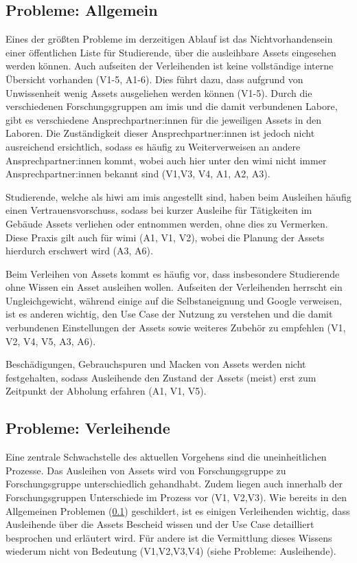 \subsection{Probleme: Allgemein}
\label{section:probleme-allgemein}
Eines der größten Probleme im derzeitigen Ablauf ist das Nichtvorhandensein
einer öffentlichen Liste für Studierende, über die ausleihbare Assets eingesehen
werden können. Auch aufseiten der Verleihenden ist keine vollständige interne
Übersicht vorhanden (V1-5, A1-6). Dies führt dazu, dass aufgrund von Unwissenheit
wenig Assets ausgeliehen werden können (V1-5). Durch die verschiedenen
Forschungsgruppen am \ac{imis} und die damit verbundenen Labore, gibt es
verschiedene Ansprechpartner:innen für die jeweiligen Assets in den Laboren. Die
Zuständigkeit dieser Ansprechpartner:innen ist jedoch nicht ausreichend
ersichtlich, sodass es häufig zu Weiterverweisen an andere Ansprechpartner:innen
kommt, wobei auch hier unter den \ac{wimi} nicht immer Ansprechpartner:innen
bekannt sind (V1,V3, V4, A1, A2, A3).

Studierende, welche als \ac{hiwi} am \ac{imis} angestellt sind, haben beim
Ausleihen häufig einen Vertrauensvorschuss, sodass bei kurzer Ausleihe für
Tätigkeiten im Gebäude Assets verliehen oder entnommen werden, ohne dies zu
Vermerken. Diese Praxis gilt auch für \ac{wimi} (A1, V1, V2), wobei die
Planung der Assets hierdurch erschwert wird (A3, A6).

Beim Verleihen von Assets kommt es häufig vor, dass insbesondere Studierende
ohne Wissen  ein Asset ausleihen wollen. Aufseiten der Verleihenden herrscht
ein Ungleichgewicht, während einige auf die Selbstaneignung und Google
verweisen, ist es anderen wichtig, den Use Case der Nutzung zu verstehen und die
damit verbundenen Einstellungen der Assets sowie weiteres Zubehör zu empfehlen
(V1, V2, V4, V5, A3, A6).

Beschädigungen, Gebrauchspuren und Macken von Assets werden nicht festgehalten,
sodass Ausleihende den Zustand der Assets (meist) erst zum Zeitpunkt der
Abholung erfahren (A1, V1, V5).

\subsection{Probleme: Verleihende}
\label{section:probleme-verleihende}
Eine zentrale Schwachstelle des aktuellen Vorgehens sind die uneinheitlichen
Prozesse. Das Ausleihen von Assets wird von Forschungsgruppe zu Forschungsgruppe
unterschiedlich gehandhabt. Zudem liegen auch innerhalb der Forschungsgruppen
Unterschiede im Prozess vor (V1, V2,V3). Wie bereits in den Allgemeinen
Problemen (\ref{section:probleme-allgemein}) geschildert, ist es einigen
Verleihenden wichtig, dass Ausleihende über die Assets Bescheid wissen und der
Use Case detailliert besprochen und erläutert wird. Für andere ist die
Vermittlung dieses Wissens wiederum nicht von Bedeutung (V1,V2,V3,V4) (siehe Probleme:
Ausleihende).

